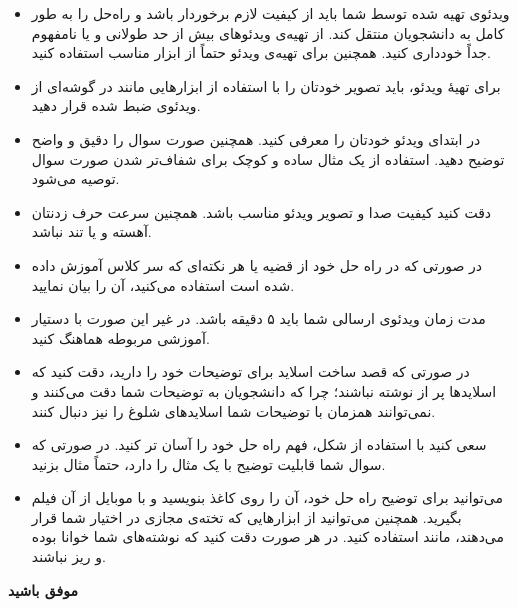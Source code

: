 \begin{itemize}[itemsep=1em, parsep=0.5em]
    \item
    ویدئوی تهیه شده توسط شما باید از کیفیت لازم برخوردار باشد و راه‌حل را به طور کامل به دانشجویان منتقل کند. از تهیه‌ی ویدئوهای بیش از حد طولانی و یا نامفهوم جداً خودداری کنید. همچنین برای تهیه‌ی ویدئو حتماً از ابزار مناسب استفاده کنید.

    \item
    برای تهیهٔ ویدئو، باید تصویر خودتان را با استفاده از ابزارهایی مانند
    \href{https://www.bandicam.com/downloads/}{}
    در گوشه‌ای از ویدئوی ضبط شده قرار دهید.

    \item
    در ابتدای ویدئو خودتان را معرفی کنید. همچنین صورت سوال را دقیق و واضح توضیح دهید. استفاده از یک مثال ساده و کوچک برای شفاف‌تر شدن صورت سوال توصیه می‌شود.

    \item
    دقت کنید کیفیت صدا و تصویر ویدئو مناسب باشد. همچنین سرعت حرف زدنتان آهسته و یا تند نباشد.

    \item
    در صورتی که در راه حل خود از قضیه یا هر نکته‌ای که سر کلاس آموزش داده شده است استفاده می‌کنید، آن را بیان نمایید.

    \item
    مدت زمان ویدئوی ارسالی شما باید ۵ دقیقه باشد. در غیر این صورت با دستیار آموزشی مربوطه هماهنگ کنید.

    \item
    در صورتی که قصد ساخت اسلاید برای توضیحات خود را دارید، دقت کنید که اسلایدها پر از نوشته نباشند؛ چرا که دانشجویان به توضیحات شما دقت می‌کنند و نمی‌توانند همزمان با توضیحات شما اسلایدهای شلوغ را نیز دنبال کنند.

    \item
    سعی کنید با استفاده از شکل، فهم راه حل خود را آسان تر کنید. در صورتی که سوال شما قابلیت توضیح با یک مثال را دارد، حتماً مثال بزنید.

    \item
    می‌توانید برای توضیح راه حل خود، آن را روی کاغذ بنویسید و با موبایل از آن فیلم بگیرید. همچنین می‌توانید از ابزارهایی که تخته‌ی مجازی در اختیار شما قرار می‌دهند، مانند
    \href{https://miro.com/online-whiteboard/?awwapp_ref=direct&utm_source=awwapp&utm_campaign=direct&utm_name=awwapp_redirect}{}
    استفاده کنید. در هر صورت دقت کنید که نوشته‌های شما خوانا بوده و ریز نباشند.

\end{itemize}

\begin{flushleft}
    \textbf{موفق باشید}
\end{flushleft}